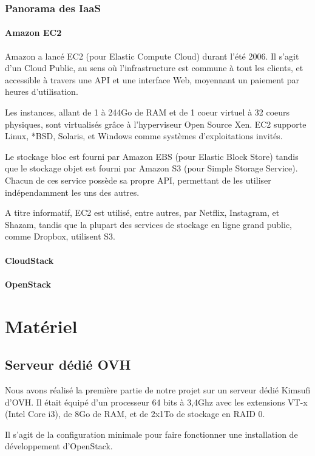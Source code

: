 \documentclass{report}
\begin{document}
\subsection{Panorama des IaaS}
\subsubsection{Amazon EC2}
Amazon a lancé EC2 (pour Elastic Compute Cloud) durant l'été 2006. Il s'agit d'un Cloud Public, au sens où l'infrastructure est commune à tout les clients, et accessible à travers une API et une interface Web, moyennant un paiement par heures d'utilisation.

Les instances, allant de 1 à 244Go de RAM et de 1 coeur virtuel à 32 coeurs physiques, sont virtualisés grâce à l'hyperviseur Open Source Xen. EC2 supporte Linux, *BSD, Solaris, et Windows comme systèmes d'exploitations invités.

Le stockage bloc est fourni par Amazon EBS (pour Elastic Block Store) tandis que le stockage objet est fourni par Amazon S3 (pour Simple Storage Service). Chacun de ces service possède sa propre API, permettant de les utiliser indépendamment les uns des autres.

A titre informatif, EC2 est utilisé, entre autres, par Netflix, Instagram, et Shazam, tandis que la plupart des services de stockage en ligne grand public, comme Dropbox, utilisent S3.

\subsubsection{CloudStack}
\subsubsection{OpenStack}


\chapter{Matériel}

\section{Serveur dédié OVH}
Nous avons réalisé la première partie de notre projet sur un serveur dédié Kimsufi d'OVH. Il était équipé d'un processeur 64 bits à 3,4Ghz avec les extensions VT-x (Intel Core i3), de 8Go de RAM, et de 2x1To de stockage en RAID 0.

Il s'agit de la configuration minimale pour faire fonctionner une installation de développement d'OpenStack.
\end{document}
